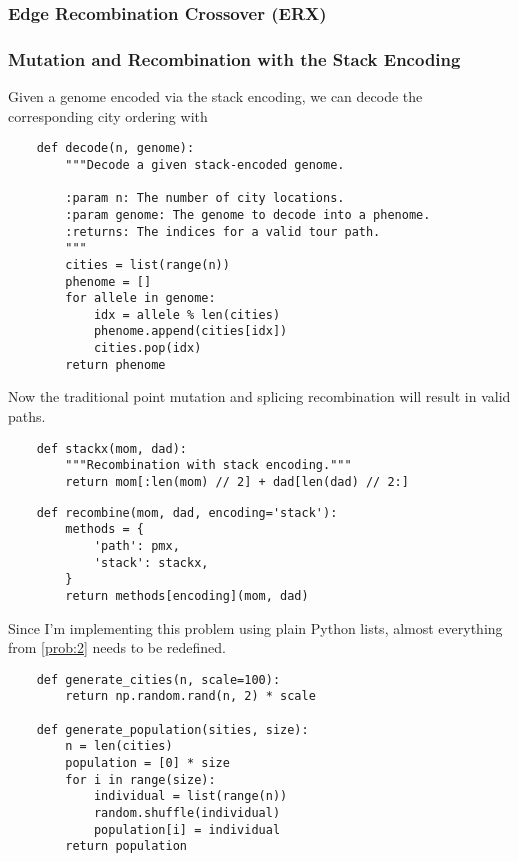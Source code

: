 \documentclass{article}
\begin{document}
\subsubsection{Edge Recombination Crossover (ERX)}

\subsubsection{Mutation and Recombination with the Stack Encoding}
Given a genome encoded via the stack encoding, we can decode the corresponding city ordering with
\begin{verbatim}
    def decode(n, genome):
        """Decode a given stack-encoded genome.

        :param n: The number of city locations.
        :param genome: The genome to decode into a phenome.
        :returns: The indices for a valid tour path.
        """
        cities = list(range(n))
        phenome = []
        for allele in genome:
            idx = allele % len(cities)
            phenome.append(cities[idx])
            cities.pop(idx)
        return phenome
\end{verbatim}
Now the traditional point mutation and splicing recombination will result in valid paths.

\begin{verbatim}
    def stackx(mom, dad):
        """Recombination with stack encoding."""
        return mom[:len(mom) // 2] + dad[len(dad) // 2:]
\end{verbatim}

\begin{verbatim}
    def recombine(mom, dad, encoding='stack'):
        methods = {
            'path': pmx,
            'stack': stackx,
        }
        return methods[encoding](mom, dad)
\end{verbatim}

Since I'm implementing this problem using plain Python lists, almost everything from
\autoref{prob:2} needs to be redefined.

\begin{verbatim}
    def generate_cities(n, scale=100):
        return np.random.rand(n, 2) * scale

    def generate_population(sities, size):
        n = len(cities)
        population = [0] * size
        for i in range(size):
            individual = list(range(n))
            random.shuffle(individual)
            population[i] = individual
        return population
\end{verbatim}
\end{document}

